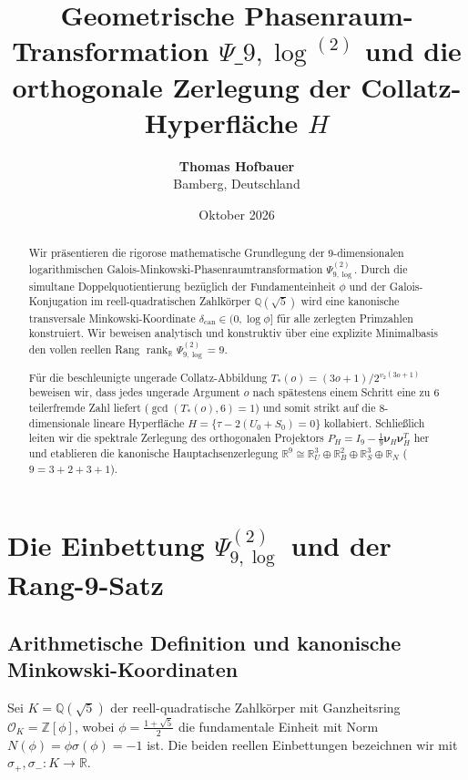 \documentclass[11pt,a4paper]{article}
\title{\textbf{Geometrische Phasenraum-Transformation $\Psi\_{9,\log}^{(2)}$ und die orthogonale Zerlegung der Collatz-Hyperfläche $H$}}
\author{\textbf{Thomas Hofbauer} \\ Bamberg, Deutschland}
\date{Oktober 2026}
\theoremstyle{plain}
\theoremstyle{definition}
\newcommand{\Z}{\mathbb{Z}}
\newcommand{\Q}{\mathbb{Q}}
\newcommand{\R}{\mathbb{R}}
\newcommand{\OK}{\mathcal{O}_K}
\DeclareMathOperator{\rank}{rank}
\begin{document}
\maketitle

\begin{abstract}
Wir präsentieren die rigorose mathematische Grundlegung der 9-dimensionalen logarithmischen Galois-Minkowski-Phasenraumtransformation $\Psi_{9,\log}^{(2)}$. Durch die simultane Doppelquotientierung bezüglich der Fundamenteinheit $\phi$ und der Galois-Konjugation im reell-quadratischen Zahlkörper $\Q(\sqrt{5})$ wird eine kanonische transversale Minkowski-Koordinate $\delta_{\mathrm{can}} \in (0, \log\phi]$ für alle zerlegten Primzahlen konstruiert. Wir beweisen analytisch und konstruktiv über eine explizite Minimalbasis den vollen reellen Rang $\rank_\R \Psi_{9,\log}^{(2)} = 9$. 

Für die beschleunigte ungerade Collatz-Abbildung $T_*(o) = (3o+1)/2^{v_2(3o+1)}$ beweisen wir, dass jedes ungerade Argument $o$ nach spätestens einem Schritt eine zu 6 teilerfremde Zahl liefert ($\gcd(T_*(o), 6) = 1$) und somit strikt auf die 8-dimensionale lineare Hyperfläche $H = \{\tau - 2(U_0 + S_0) = 0\}$ kollabiert. Schließlich leiten wir die spektrale Zerlegung des orthogonalen Projektors $P_H = I_9 - \frac{1}{9}\boldsymbol{\nu}_H \boldsymbol{\nu}_H^T$ her und etablieren die kanonische Hauptachsenzerlegung $\R^9 \cong \R^3_U \oplus \R^2_B \oplus \R^3_S \oplus \R_N$ ($9 = 3 + 2 + 3 + 1$).
\end{abstract}

\tableofcontents
\newpage

\section{Die Einbettung \texorpdfstring{$\Psi_{9,\log}^{(2)}$}{Psi9,log(2)} und der Rang-9-Satz}

\subsection{Arithmetische Definition und kanonische Minkowski-Koordinaten}

Sei $K = \Q(\sqrt{5})$ der reell-quadratische Zahlkörper mit Ganzheitsring $\OK = \Z[\phi]$, wobei $\phi = \frac{1+\sqrt{5}}{2}$ die fundamentale Einheit mit Norm $N(\phi) = \phi \sigma(\phi) = -1$ ist. Die beiden reellen Einbettungen bezeichnen wir mit $\sigma_+, \sigma_-: K \to \R$.
\end{document}
